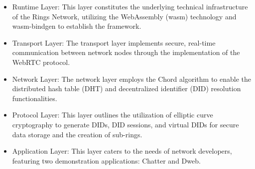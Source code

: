 \documentclass[twocolumn]{article}
\begin{document}
\begin{itemize}[itemsep=2pt,topsep=0pt,parsep=0pt]
\item Runtime Layer: This layer constitutes the underlying technical infrastructure of the Rings Network, utilizing the WebAssembly (wasm) technology and wasm-bindgen to establish the framework.
\item Transport Layer: The transport layer implements secure, real-time communication between network nodes through the implementation of the WebRTC protocol.
\item Network Layer: The network layer employs the Chord algorithm to enable the distributed hash table (DHT) and decentralized identifier (DID) resolution functionalities.
\item Protocol Layer: This layer outlines the utilization of elliptic curve cryptography to generate DIDs, DID sessions, and virtual DIDs for secure data storage and the creation of sub-rings.
\item Application Layer: This layer caters to the needs of network developers, featuring two demonstration applications: Chatter and Dweb.
\end{itemize}

\end{document}

